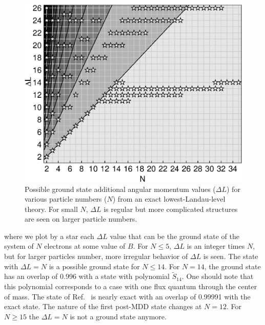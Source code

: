 \documentclass{article}
\begin{document}
\begin{figure}[hbt]
\begin{center}
  \includegraphics[width=0.99\columnwidth]{P}
\end{center}
\caption{Possible ground state additional angular momentum values
($\Delta L$) for various particle numbers ($N$) from an exact
lowest-Landau-level theory. For small $N$, $\Delta L$ is regular but
more complicated structures are seen on larger particle numbers.}
\label{GSs}
\end{figure}
%
where we plot by a star each $\Delta L$ value that can be the
ground state of the system of $N$ electrons at some value of $B$.  For
$N\le5$, $\Delta L$ is an integer times $N$, but for larger particles
number, more irregular behavior of $\Delta L$ is seen. The state with
$\Delta L = N$ is a possible ground state for $N \le 14$. For $N=14$,
the ground state has an overlap of 0.996 with a state with polynomial
$\tilde S_{14}$. One should note that this polynomial corresponds to a
case with one flux quantum through the center of mass.  The state of
Ref.~ is nearly exact with an overlap of 0.99991
with the exact state. The nature of the first post-MDD state changes
at $N=12$. For $N\ge 15$ the $\Delta L = N$ is not a ground state
anymore.
\end{document}
